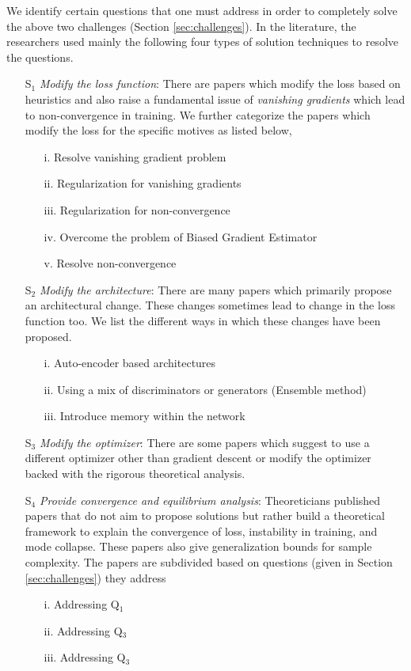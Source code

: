 \bigskip

We identify certain questions that one must address in order to completely solve the above two challenges (Section \ref{sec:challenges}). In the literature, the researchers used mainly the following four types of solution techniques to resolve the questions. 
\bigskip
\begin{itemize}
    \item[S$_1$] \emph{Modify the loss function}: There are papers which modify the loss based on heuristics and also raise a fundamental issue of \emph{vanishing gradients} which lead to non-convergence in training. We further categorize the papers which modify the loss for the specific motives as listed below,
    \begin{itemize}
        \item[i.] Resolve vanishing gradient problem
        \item[ii.]Regularization for vanishing gradients
        \item[iii.]Regularization for non-convergence
        \item[iv.] Overcome the problem of Biased Gradient Estimator
        \item[v.] Resolve non-convergence
    \end{itemize}
    \item[S$_2$] \emph{Modify the architecture}: There are many papers which primarily propose an architectural change. These changes sometimes lead to change in the loss function too. We list the different ways in which these changes have been proposed. 
    \begin{itemize}
        \item[i.] Auto-encoder based architectures
        \item[ii.] Using a mix of discriminators or generators (Ensemble method)
        \item[iii.] Introduce memory within the network
    \end{itemize}{}
    \item[S$_3$] \emph{Modify the optimizer}: There are some papers which suggest to use a different optimizer other than gradient descent or modify the optimizer backed with the rigorous theoretical analysis.
    \item[S$_4$] \emph{Provide convergence and equilibrium analysis}: Theoreticians published papers that do not aim to propose solutions but rather build a theoretical framework to explain the convergence of loss, instability in training, and mode collapse. These papers also give generalization bounds for sample complexity. The papers are subdivided based on questions (given in Section \ref{sec:challenges}) they address
    \begin{itemize}
        \item[i.] Addressing Q$_1$
        \item[ii.] Addressing Q$_3$
        \item[iii.] Addressing Q$_3$
    \end{itemize}{}
\end{itemize}

